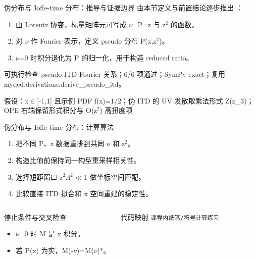 \begin{frame}[t]{伪分布与 Ioffe-time 分布：推导与证据边界}
\footnotesize
{}\quad 由本节定义与前置结论逐步推出 ：
\begin{enumerate}
\item 由 Lorentz 协变，标量矩阵元可写成 \ensuremath{\nu}=P·z 与 z\ensuremath{^{2}} 的函数。
\item 对 \ensuremath{\nu} 作 Fourier 表示，定义 pseudo 分布 P(x,z\ensuremath{^{2}})。
\item \ensuremath{\nu}=0 时积分退化为 P 的归一化，用于构造 reduced ratio。
\end{enumerate}\begin{block}{可执行检查}
\quad pseudo-ITD Fourier 关系；6/6 项通过；SymPy exact；复用 myqcd.derivations.derive\_pseudo\_itd。
\par\scriptsize 假设：x\ensuremath{\in}[-1,1] 且示例 PDF f(x)=1/\allowbreak{}2；伪 ITD 的 UV 发散取乘法形式 Z(z\_3)；OPE 右端保留形式积分与 O(z\ensuremath{^{2}}) 高扭度项
\end{block}
\end{frame}

\begin{frame}[t]{伪分布与 Ioffe-time 分布：计算算法}
\footnotesize
{}\begin{enumerate}
\item 把不同 P、z 数据重排到共同 \ensuremath{\nu} 和 z\ensuremath{^{2}}。
\item 构造比值前保持同一构型重采样相关性。
\item 选择短距窗口 z\ensuremath{^{2}}\ensuremath{\Lambda}\ensuremath{^{2}}\ensuremath{\ll}1 做坐标空间匹配。
\item 比较直接 ITD 拟合和 x 空间重建的稳定性。
\end{enumerate}\begin{columns}[T,onlytextwidth]
\begin{block}{停止条件与交叉检查}\scriptsize\begin{itemize}
\item[\CheckMark] \ensuremath{\nu}=0 时 M 是 x 积分。
\item[\CheckMark] 若 P(x) 为实，M(-\ensuremath{\nu})=M(\ensuremath{\nu})*。
\end{itemize}\end{block}
\begin{block}{代码映射}
\scriptsize \texttt{课程内纸笔/\allowbreak{}符号计算练习}
\end{block}\end{columns}\end{frame}

